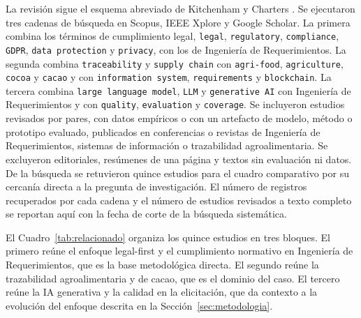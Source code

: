 \documentclass[pdflatex,sn-mathphys-num]{sn-jnl}
\begin{document}
La revisi\'on sigue el esquema abreviado de Kitchenham y Charters \cite{kitchenham2007}. Se ejecutaron tres cadenas de b\'usqueda en Scopus, IEEE Xplore y Google Scholar. La primera combina los t\'erminos de cumplimiento legal, \texttt{legal}, \texttt{regulatory}, \texttt{compliance}, \texttt{GDPR}, \texttt{data protection} y \texttt{privacy}, con los de Ingenier\'ia de Requerimientos. La segunda combina \texttt{traceability} y \texttt{supply chain} con \texttt{agri-food}, \texttt{agriculture}, \texttt{cocoa} y \texttt{cacao} y con \texttt{information system}, \texttt{requirements} y \texttt{blockchain}. La tercera combina \texttt{large language model}, \texttt{LLM} y \texttt{generative AI} con Ingenier\'ia de Requerimientos y con \texttt{quality}, \texttt{evaluation} y \texttt{coverage}. Se incluyeron estudios revisados por pares, con datos emp\'iricos o con un artefacto de modelo, m\'etodo o prototipo evaluado, publicados en conferencias o revistas de Ingenier\'ia de Requerimientos, sistemas de informaci\'on o trazabilidad agroalimentaria. Se excluyeron editoriales, res\'umenes de una p\'agina y textos sin evaluaci\'on ni datos. De la b\'usqueda se retuvieron quince estudios para el cuadro comparativo por su cercan\'ia directa a la pregunta de investigaci\'on. El n\'umero de registros recuperados por cada cadena y el n\'umero de estudios revisados a texto completo se reportan aqu\'i con la fecha de corte de la b\'usqueda sistem\'atica.

El Cuadro~\ref{tab:relacionado} organiza los quince estudios en tres bloques. El primero re\'une el enfoque legal-first y el cumplimiento normativo en Ingenier\'ia de Requerimientos, que es la base metodol\'ogica directa. El segundo re\'une la trazabilidad agroalimentaria y de cacao, que es el dominio del caso. El tercero re\'une la IA generativa y la calidad en la elicitaci\'on, que da contexto a la evoluci\'on del enfoque descrita en la Secci\'on~\ref{sec:metodologia}.
\end{document}
